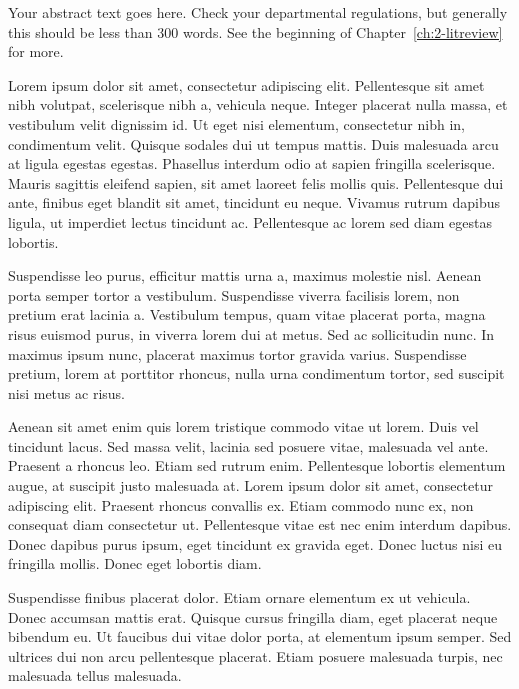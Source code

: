 Your abstract text goes here.  Check your departmental regulations, but generally this should be less than 300 words.  See the beginning of Chapter~\ref{ch:2-litreview} for more.

Lorem ipsum dolor sit amet, consectetur adipiscing elit. Pellentesque sit amet nibh volutpat, scelerisque nibh a, vehicula neque. Integer placerat nulla massa, et vestibulum velit dignissim id. Ut eget nisi elementum, consectetur nibh in, condimentum velit. Quisque sodales dui ut tempus mattis. Duis malesuada arcu at ligula egestas egestas. Phasellus interdum odio at sapien fringilla scelerisque. Mauris sagittis eleifend sapien, sit amet laoreet felis mollis quis. Pellentesque dui ante, finibus eget blandit sit amet, tincidunt eu neque. Vivamus rutrum dapibus ligula, ut imperdiet lectus tincidunt ac. Pellentesque ac lorem sed diam egestas lobortis.

Suspendisse leo purus, efficitur mattis urna a, maximus molestie nisl. Aenean porta semper tortor a vestibulum. Suspendisse viverra facilisis lorem, non pretium erat lacinia a. Vestibulum tempus, quam vitae placerat porta, magna risus euismod purus, in viverra lorem dui at metus. Sed ac sollicitudin nunc. In maximus ipsum nunc, placerat maximus tortor gravida varius. Suspendisse pretium, lorem at porttitor rhoncus, nulla urna condimentum tortor, sed suscipit nisi metus ac risus.

Aenean sit amet enim quis lorem tristique commodo vitae ut lorem. Duis vel tincidunt lacus. Sed massa velit, lacinia sed posuere vitae, malesuada vel ante. Praesent a rhoncus leo. Etiam sed rutrum enim. Pellentesque lobortis elementum augue, at suscipit justo malesuada at. Lorem ipsum dolor sit amet, consectetur adipiscing elit. Praesent rhoncus convallis ex. Etiam commodo nunc ex, non consequat diam consectetur ut. Pellentesque vitae est nec enim interdum dapibus. Donec dapibus purus ipsum, eget tincidunt ex gravida eget. Donec luctus nisi eu fringilla mollis. Donec eget lobortis diam.

Suspendisse finibus placerat dolor. Etiam ornare elementum ex ut vehicula. Donec accumsan mattis erat. Quisque cursus fringilla diam, eget placerat neque bibendum eu. Ut faucibus dui vitae dolor porta, at elementum ipsum semper. Sed ultrices dui non arcu pellentesque placerat. Etiam posuere malesuada turpis, nec malesuada tellus malesuada.